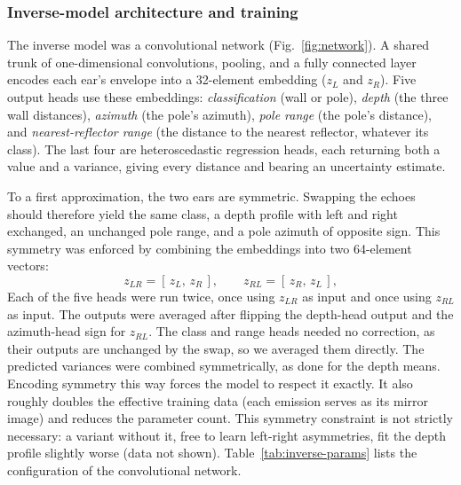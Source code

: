 \documentclass[11pt]{article}
\begin{document}
\subsubsection{Inverse-model architecture and training}
\label{sec:inverse-training}

The inverse model was a convolutional network (Fig.~\ref{fig:network}). A shared trunk of one-dimensional convolutions, pooling, and a fully connected layer encodes each ear's envelope into a 32-element embedding ($z_L$ and $z_R$). Five output heads use these embeddings: \emph{classification} (wall or pole), \emph{depth} (the three wall distances), \emph{azimuth} (the pole's azimuth), \emph{pole range} (the pole's distance), and \emph{nearest-reflector range} (the distance to the nearest reflector, whatever its class). The last four are heteroscedastic regression heads, each returning both a value and a variance, giving every distance and bearing an uncertainty estimate.

To a first approximation, the two ears are symmetric. Swapping the echoes should therefore yield the same class, a depth profile with left and right exchanged, an unchanged pole range, and a pole azimuth of opposite sign. This symmetry was enforced by combining the embeddings into two 64-element vectors:
%
\begin{equation}
	z_{LR} = [\,z_L,\, z_R\,], \qquad z_{RL} = [\,z_R,\, z_L\,],
\end{equation}
%
Each of the five heads were run twice, once using $z_{LR}$ as input and once using $z_{RL}$ as input. The outputs were averaged after flipping the depth-head output and the azimuth-head sign for $z_{RL}$. The class and range heads needed no correction, as their outputs are unchanged by the swap, so we averaged them directly. The predicted variances were combined symmetrically, as done for the depth means. Encoding symmetry this way forces the model to respect it exactly. It also roughly doubles the effective training data (each emission serves as its mirror image) and reduces the parameter count. This symmetry constraint is not strictly necessary: a variant without it, free to learn left-right asymmetries, fit the depth profile slightly worse (data not shown). Table~\ref{tab:inverse-params} lists the configuration of the  convolutional network.
\end{document}

